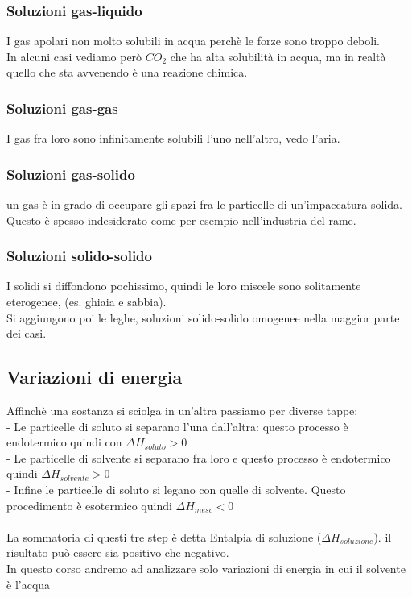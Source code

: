 \subsubsection{Soluzioni gas-liquido}
I gas apolari non molto solubili in acqua perchè le forze sono troppo deboli.\\
In alcuni casi vediamo però $CO_2$ che ha alta solubilità in acqua, ma in realtà quello che sta avvenendo è una reazione chimica.
\subsubsection{Soluzioni gas-gas}
I gas fra loro sono infinitamente solubili l'uno nell'altro, vedo l'aria.
\subsubsection{Soluzioni gas-solido}
un gas è in grado di occupare gli spazi fra le particelle di un'impaccatura solida. Questo è spesso indesiderato come per esempio nell'industria del rame.
\subsubsection{Soluzioni solido-solido}
I solidi si diffondono pochissimo, quindi le loro miscele sono solitamente eterogenee, (es. ghiaia e sabbia).\\
Si aggiungono poi le leghe, soluzioni solido-solido omogenee nella maggior parte dei casi.
\subsection{Variazioni di energia}
Affinchè una sostanza si sciolga in un’altra  passiamo per diverse tappe:\\
\tab- Le particelle di soluto si separano l’una dall’altra: questo processo è endotermico quindi con $\Delta H_{soluto} > 0$\\
\tab- Le particelle di solvente si separano fra loro e questo processo è endotermico quindi $\Delta H_{solvente} > 0$\\
\tab- Infine le particelle di soluto si legano con quelle di solvente. Questo procedimento è esotermico quindi $\Delta H_{mesc} < 0$ \\\\
La sommatoria di questi tre step è detta Entalpia di soluzione ($\Delta H_{soluzione}$). il risultato può essere sia positivo che negativo.\\
In questo corso andremo ad analizzare solo variazioni di energia in cui il solvente è l’acqua

